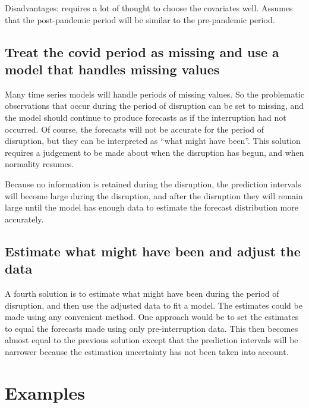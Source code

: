 \documentclass[11pt,a4paper,]{article}
\begin{document}
Disadvantages: requires a lot of thought to choose the covariates well.
Assumes that the post-pandemic period will be similar to the
pre-pandemic period.

\hypertarget{treat-the-covid-period-as-missing-and-use-a-model-that-handles-missing-values}{%
\subsection{Treat the covid period as missing and use a model that
handles missing
values}\label{treat-the-covid-period-as-missing-and-use-a-model-that-handles-missing-values}}

Many time series models will handle periods of missing values. So the
problematic observations that occur during the period of disruption can
be set to missing, and the model should continue to produce forecasts as
if the interruption had not occurred. Of course, the forecasts will not
be accurate for the period of disruption, but they can be interpreted as
``what might have been''. This solution requires a judgement to be made
about when the disruption has begun, and when normality resumes.

Because no information is retained during the disruption, the prediction
intervals will become large during the disruption, and after the
disruption they will remain large until the model has enough data to
estimate the forecast distribution more accurately.

\hypertarget{estimate-what-might-have-been-and-adjust-the-data}{%
\subsection{Estimate what might have been and adjust the
data}\label{estimate-what-might-have-been-and-adjust-the-data}}

A fourth solution is to estimate what might have been during the period
of disruption, and then use the adjusted data to fit a model. The
estimates could be made using any convenient method. One approach would
be to set the estimates to equal the forecasts made using only
pre-interruption data. This then becomes almost equal to the previous
solution except that the prediction intervals will be narrower because
the estimation uncertainty has not been taken into account.

\hypertarget{examples}{%
\section{Examples}\label{examples}}
\end{document}
